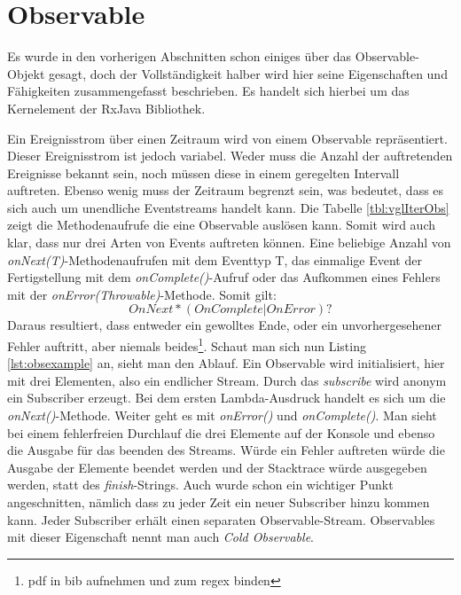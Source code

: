 \section{Observable}
Es wurde in den vorherigen Abschnitten schon einiges über das Observable-Objekt gesagt, doch der Vollständigkeit halber wird hier seine Eigenschaften und Fähigkeiten zusammengefasst beschrieben. Es handelt sich hierbei um das Kernelement der RxJava Bibliothek.

Ein Ereignisstrom über einen Zeitraum wird von einem Observable repräsentiert. Dieser Ereignisstrom ist jedoch variabel. Weder muss die Anzahl der auftretenden Ereignisse bekannt sein, noch müssen diese in einem geregelten Intervall auftreten. Ebenso wenig muss der Zeitraum begrenzt sein, was bedeutet, dass es sich auch um unendliche Eventstreams handelt kann. Die Tabelle \ref{tbl:vglIterObs} zeigt die Methodenaufrufe die eine Observable auslösen kann. Somit wird auch klar, dass nur drei Arten von Events auftreten können. Eine beliebige Anzahl von \textit{onNext(T)}-Methodenaufrufen mit dem Eventtyp T, das einmalige Event der Fertigstellung mit dem \textit{onComplete()}-Aufruf oder das Aufkommen eines Fehlers mit der \textit{onError(Throwable)}-Methode. Somit gilt: 
\begin{displaymath}
	OnNext*(OnComplete | OnError)?
\end{displaymath}
Daraus resultiert, dass entweder ein gewolltes Ende, oder ein unvorhergesehener Fehler auftritt, aber niemals beides\footnote{pdf in bib aufnehmen und zum regex binden}. Schaut man sich nun Listing \ref{lst:obsexample} an, sieht man den Ablauf. Ein Observable wird initialisiert, hier mit drei Elementen, also ein endlicher Stream. Durch das \textit{subscribe} wird anonym ein Subscriber erzeugt. Bei dem ersten Lambda-Ausdruck handelt es sich um die \textit{onNext()}-Methode. Weiter geht es mit \textit{onError()} und \textit{onComplete()}. Man sieht bei einem fehlerfreien Durchlauf die drei Elemente auf der Konsole und ebenso die Ausgabe für das beenden des Streams. Würde ein Fehler auftreten würde die Ausgabe der Elemente beendet werden und der Stacktrace würde ausgegeben werden, statt des \textit{finish}-Strings. Auch wurde schon ein wichtiger Punkt angeschnitten, nämlich dass zu jeder Zeit ein neuer Subscriber hinzu kommen kann. Jeder Subscriber erhält einen separaten Observable-Stream. Observables mit dieser Eigenschaft nennt man auch \textit{Cold Observable}.
